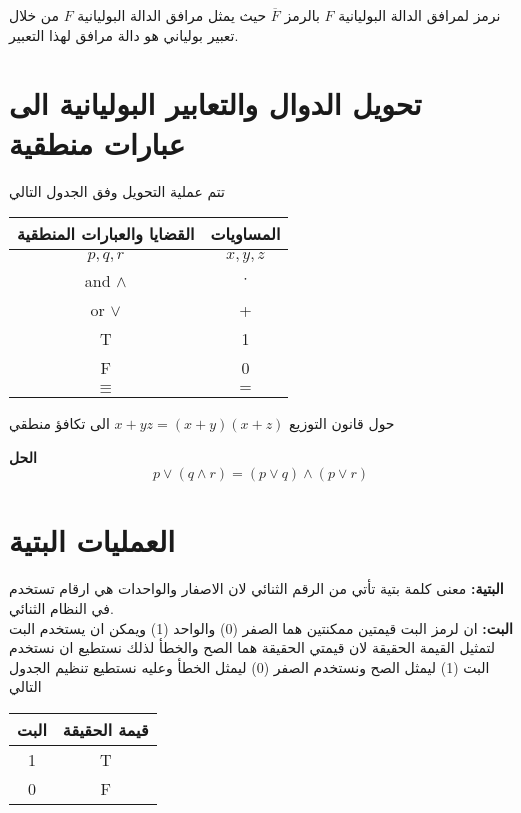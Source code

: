\begin{note}
	نرمز لمرافق الدالة البوليانية $F$ بالرمز $\overline{F}$ حيث يمثل مرافق الدالة البوليانية $F$ من خلال تعبير بولياني هو دالة مرافق لهذا التعبير.
\end{note}

\section{تحويل الدوال والتعابير البوليانية الى عبارات منطقية}
تتم عملية التحويل وفق الجدول التالي

\begin{table}[H]
	\centering
	\renewcommand{\arraystretch}{1.4}
	\begin{tabular}{|c|c|}
				\hline
		\textbf{القضايا والعبارات المنطقية} & \textbf{المساويات}\\
		\hline
		$p, q, r$ & $x, y, z$\\
		and $\wedge$ & $\cdot$\\
		or $\vee$ & +\\
		T & 1\\
		F & 0\\
		$\equiv$ & $=$\\
				\hline
	\end{tabular}
\end{table}

\begin{example}
	حول قانون التوزيع $x+yz = (x+y)(x+z)$ الى تكافؤ منطقي
\end{example}
\noindent
\textbf{الحل}
\[
p \vee (q \wedge r) = (p \vee q) \wedge ( p \vee r)
\]

\section{العمليات البتية}
\textbf{البتية:} معنى كلمة بتية تأتي من الرقم الثنائي لان الاصفار والواحدات  هي ارقام تستخدم في النظام الثنائي.\\
\textbf{البت:} ان لرمز البت قيمتين ممكنتين هما الصفر (0) والواحد (1) ويمكن ان يستخدم البت لتمثيل القيمة الحقيقة لان قيمتي الحقيقة هما الصح والخطأ لذلك نستطيع ان نستخدم البت (1) ليمثل الصح ونستخدم الصفر (0) ليمثل الخطأ وعليه نستطيع تنظيم الجدول التالي

\begin{table}[H]
	\centering
	\renewcommand{\arraystretch}{1.4}
	\begin{tabular}{|c|c|}
		\hline
		\textbf{البت} & \textbf{قيمة الحقيقة}\\
		\hline
		1 & T\\
		0 & F\\
		\hline
	\end{tabular}
\end{table}


